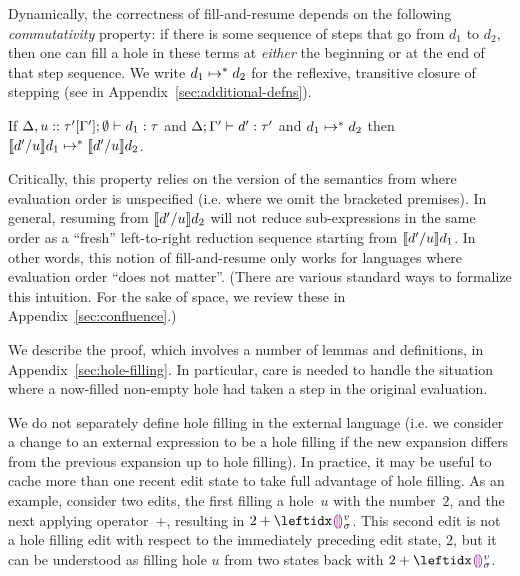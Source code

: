 Dynamically, the correctness of fill-and-resume depends on
the following \emph{commutativity} property: if there is some sequence of
steps that go from $d_1$ to $d_2$, then one can fill a hole in these
terms at \emph{either} the beginning or at the end of that step
sequence.
%
We write $d_1 \mapsto^* d_2$ for the reflexive,
transitive closure of stepping (see  in
Appendix~\ref{sec:additional-defns}).
%
\begin{thm}[Commutativity]
  If $\Delta, u :: \tau'[\Gamma']; \emptyset \vdash d_1 : \tau$
  and $\Delta; \Gamma' \vdash d' : \tau'$ and $d_1 \mapsto^* d_2$
  then $\llbracket d' / u\rrbracket d_1 \mapsto^* \llbracket d' / u\rrbracket d_2$.
\end{thm}
%
Critically, this property relies on the version of
the semantics from  where evaluation order is
unspecified (i.e. where we omit the bracketed premises).
%
In general, resuming from $\llbracket d' / u\rrbracket d_2$ will not
reduce sub-expressions in the same order as a ``fresh'' left-to-right
reduction sequence starting from $\llbracket d' / u\rrbracket d_1$.
%
In other words, this notion of fill-and-resume only works for
languages where evaluation order ``does not matter''.
(There are various standard ways to formalize this intuition.
For the sake of space, we review these in Appendix~\ref{sec:confluence}.)


We describe the proof, which involves a
number of lemmas and definitions, in Appendix~\ref{sec:hole-filling}.
%
In particular, care is needed to handle the situation where a
now-filled non-empty hole had taken a step in the original evaluation.


We do not separately define hole filling in the external language
(i.e. we consider a change to an external expression to be a hole filling if the new expansion differs from
the previous expansion up to hole filling).
In practice, it may be useful to cache more than one recent edit state
to take full advantage of hole filling.
As an example, consider two edits, the first filling a hole~$u$ with
the number~$2$, and the next applying operator~$+$, resulting in $2
+ \dehole{v}{\sigma}{}$.
%
This second edit is not a hole filling edit with respect to the
immediately preceding edit state, $2$, but it can be understood as filling
hole $u$ from two states back with $2 + \dehole{v}{\sigma}{}$.


